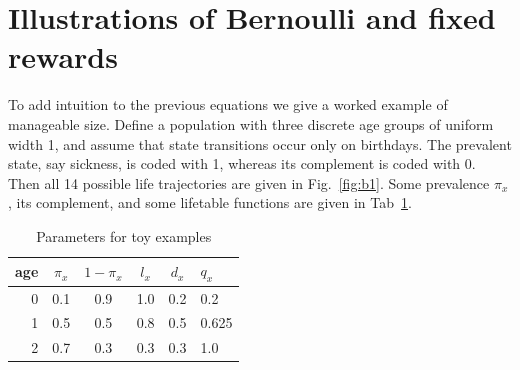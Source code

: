 \documentclass{bmcart}
\begin{document}
\section{Illustrations of Bernoulli and fixed rewards}
To add intuition to the previous equations we give a worked example of manageable size. Define a population with three discrete age groups of uniform width 1, and assume that state transitions occur only on birthdays. The prevalent state, say sickness, is coded with 1, whereas its complement is coded with 0. Then all 14 possible life trajectories are given in Fig.~\ref{fig:b1}. Some prevalence $\pi_x$, its complement, and some lifetable functions are given in Tab~\ref{tab:toy}.

\begin{table}[ht!]
\begin{tabular}{r|ccccl}
age & $\pi_x$ & $1-\pi_x$ & $l_x$ & $d_x$ & $q_x$\\
\hline
0 & 0.1 & 0.9 & 1.0 & 0.2 & 0.2   \\
1 & 0.5 & 0.5 & 0.8 & 0.5 & 0.625 \\
2 & 0.7 & 0.3 & 0.3 & 0.3 & 1.0  
\end{tabular}
\caption{Parameters for toy examples}
\label{tab:toy}
\end{table}
\end{document}
